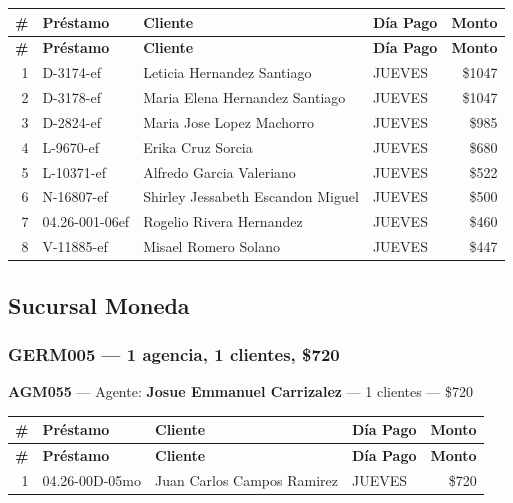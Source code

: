 \documentclass[11pt,a4paper]{article}
\newcommand{\money}[1]{\$\num{#1}}
\begin{document}
\begin{center}
\renewcommand{\arraystretch}{1.1}
\footnotesize
\begin{longtable}{rlp{6.5cm}lr}
\toprule
\textbf{\#} & \textbf{Pr\'estamo} & \textbf{Cliente} & \textbf{D\'ia Pago} & \textbf{Monto} \\
\midrule
\endfirsthead
\toprule
\textbf{\#} & \textbf{Pr\'estamo} & \textbf{Cliente} & \textbf{D\'ia Pago} & \textbf{Monto} \\
\midrule
\endhead
1 & D-3174-ef & Leticia Hernandez Santiago & JUEVES & \money{1047} \\
2 & D-3178-ef & Maria Elena Hernandez Santiago & JUEVES & \money{1047} \\
3 & D-2824-ef & Maria Jose Lopez Machorro & JUEVES & \money{985} \\
4 & L-9670-ef & Erika Cruz Sorcia & JUEVES & \money{680} \\
5 & L-10371-ef & Alfredo Garcia Valeriano & JUEVES & \money{522} \\
6 & N-16807-ef & Shirley Jessabeth Escandon Miguel & JUEVES & \money{500} \\
7 & 04.26-001-06ef & Rogelio Rivera Hernandez & JUEVES & \money{460} \\
8 & V-11885-ef & Misael Romero Solano & JUEVES & \money{447} \\

\bottomrule
\end{longtable}
\end{center}
\newpage
\subsection{Sucursal Moneda}

\subsubsection{GERM005 --- 1 agencia, 1 clientes, \money{720}}

\noindent\textbf{AGM055} --- Agente: \textbf{Josue Emmanuel Carrizalez} --- 1 clientes --- \money{720}


\begin{center}
\renewcommand{\arraystretch}{1.1}
\footnotesize
\begin{longtable}{rlp{6.5cm}lr}
\toprule
\textbf{\#} & \textbf{Pr\'estamo} & \textbf{Cliente} & \textbf{D\'ia Pago} & \textbf{Monto} \\
\midrule
\endfirsthead
\toprule
\textbf{\#} & \textbf{Pr\'estamo} & \textbf{Cliente} & \textbf{D\'ia Pago} & \textbf{Monto} \\
\midrule
\endhead
1 & 04.26-00D-05mo & Juan Carlos Campos Ramirez & JUEVES & \money{720} \\

\bottomrule
\end{longtable}
\end{center}
\newpage
\end{document}
